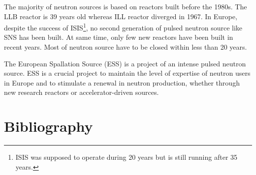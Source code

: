 \begin{refsection}
  The majority of neutron sources is based on reactors built before the 1980s.
  The LLB reactor is 39 years old whereas ILL reactor diverged in 1967. In Europe, despite the success of ISIS\footnote{ISIS was supposed to operate during 20 years but is still running after 35 years.}, no second generation of pulsed neutron source like SNS has been built. At same time, only few new reactors have been built in recent years. Most of neutron source have to be closed within less than 20 years.

  The European Spallation Source (ESS) is a project of an intense pulsed neutron source. ESS is a crucial project to maintain the level of expertise of neutron users in Europe and to stimulate a renewal in neutron production, whether through new research reactors or accelerator-driven sources.

  

  \cleardoublepage
  \section{Bibliography}

  \printbibliography[heading=subbibliography]
\end{refsection}